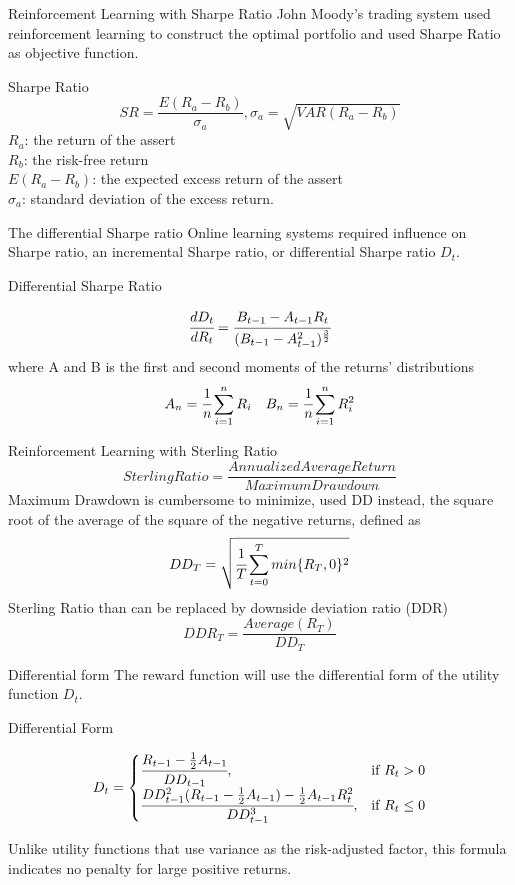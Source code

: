 \begin{frame}{Reinforcement Learning with Sharpe Ratio}
John Moody's trading system used reinforcement learning to construct the optimal portfolio and used Sharpe Ratio as objective function.

\begin{block}{Sharpe Ratio}
\[ SR = \frac{E(R_a - R_b)}{\sigma_a},
\sigma_a = \sqrt{VAR(R_a-R_b)}\]
\(R_a\): the return of the assert
\\
\(R_b\): the risk-free return
\\
\(E(R_a - R_b)\): the expected excess return of the assert
\\
\(\sigma_a\): standard deviation of the excess return.
\end{block}

\end{frame}
\begin{frame}{The differential Sharpe ratio}
Online learning systems required influence on Sharpe ratio, an incremental Sharpe ratio, or differential Sharpe ratio \(D_t\).
\begin{block}{Differential Sharpe Ratio}

\[
\cfrac{d D_t}{d R_t} = 
\cfrac{B_{t-1}-A_{t-1} R_t}{(B_{t-1}-A_{t-1}^2)^\frac{3}{2}}
\]
where
A and B is the first and second moments of the returns' distributions
\[ A_n = \cfrac{1}{n}\sum_{i=1}^nR_i\quad
B_n = \cfrac{1}{n}\sum_{i=1}^nR_i^2
\]
\end{block}
\end{frame}
\begin{frame}{Reinforcement Learning with Sterling Ratio}
\[
Sterling Ratio=\frac{Annualized Average Return}{Maximum Drawdown}
\]
Maximum Drawdown is cumbersome to minimize, used DD instead, the square root of the average of the
square of the negative returns, defined as
\[
DD_T = \sqrt{\cfrac{1}{T}\sum_{t=0}^{T}{min\{R_T,0\}^2}}
\]
Sterling Ratio than can be replaced by downside deviation ratio (DDR)
\[
DDR_T = \frac{Average(R_T)}{DD_T}
\]
\end{frame}



\begin{frame}{Differential form}
The reward function will use the differential form of the utility function \(D_t\).

\begin{block}{Differential Form}

\[
D_t = 
\begin{cases}
    \cfrac{R_{t-1} -\frac{1}{2}A_{t-1}}{DD_{t-1}},&\text{if  }R_t > 0\\
    \cfrac{DD_{t-1}^2 (R_{t-1}-\frac{1}{2}A_{t-1})  -\frac{1}{2}A_{t-1} R_t^2}{DD_{t-1}^3},&\text{if  }R_t \leq 0
\end{cases}
\]
\end{block}
Unlike utility functions that use variance as the risk-adjusted factor, this formula indicates no penalty for large positive returns. 

\end{frame}